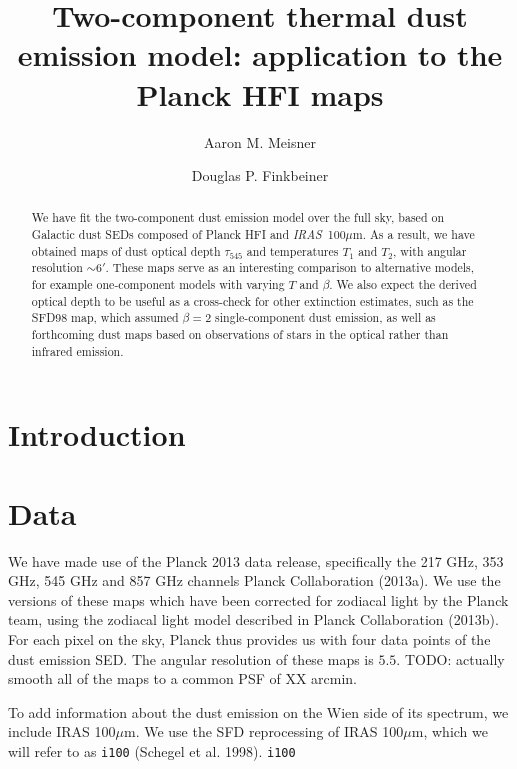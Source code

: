 \documentclass{emulateapj}
\newcommand{\IRAS}{{\it IRAS}}
\begin{document}
 

\title{Two-component thermal dust emission model: application to the Planck HFI maps}
\author{Aaron M. Meisner}
\author{Douglas P. Finkbeiner}

\begin{abstract}
We have fit the \cite{FDS99} two-component dust emission model over
the full sky, based on Galactic dust SEDs composed of  Planck HFI and \cite{SFD} 
\IRAS~100$\mu$m. As a result, we have obtained maps of dust optical depth $\tau_{545}$ 
and temperatures $T_1$ and $T_2$,  with angular resolution  $\sim$6$'$. These maps 
serve as an interesting comparison to alternative models, for example 
one-component models with varying $T$ and $\beta$. We also expect the derived 
optical depth to be useful as a cross-check for other extinction estimates, 
such as the SFD98 map, which assumed $\beta = 2$ single-component dust 
emission, as well as forthcoming dust maps based on observations of stars in 
the optical rather than infrared emission. %
\end{abstract}

\section{Introduction}

\section{Data}

We have made use of the Planck 2013 data release, specifically the 217 GHz, 
353 GHz, 545 GHz and 857 GHz channels Planck Collaboration (2013a). We use the 
versions of these maps which have been corrected for zodiacal light by the 
Planck team, using the zodiacal light model described in Planck Collaboration 
(2013b). For each pixel on the sky, Planck thus provides us with four data 
points of the dust emission SED. The angular resolution of these maps is 
$5.5$. TODO: actually smooth all of the maps to a common PSF of XX arcmin.

To add information about the dust emission on the Wien side of its spectrum,
we include IRAS 100$\mu$m. We use the SFD reprocessing of IRAS 100$\mu$m, which
we will refer to as \verb|i100| (Schegel et al. 1998). \verb|i100|
\end{document}
